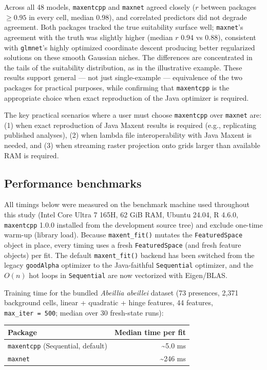 \documentclass[10pt,letterpaper]{article}
\newcounter{none} %
\begin{document}
Across all 48 models, \texttt{maxentcpp} and \texttt{maxnet} agreed
closely (\(r\) between packages \(\ge 0.95\) in every cell, median
0.98), and correlated predictors did not degrade agreement. Both
packages tracked the true suitability surface well; \texttt{maxnet}'s
agreement with the truth was slightly higher (median \(r\) 0.94 vs
0.88), consistent with \texttt{glmnet}'s highly optimized coordinate
descent producing better regularized solutions on these smooth Gaussian
niches. The differences are concentrated in the tails of the suitability
distribution, as in the illustrative example. These results support
general --- not just single-example --- equivalence of the two packages
for practical purposes, while confirming that \texttt{maxentcpp} is the
appropriate choice when exact reproduction of the Java optimizer is
required.

The key practical scenarios where a user must choose \texttt{maxentcpp}
over \texttt{maxnet} are: (1) when exact reproduction of Java Maxent
results is required (e.g., replicating published analyses), (2) when
lambda file interoperability with Java Maxent is needed, and (3) when
streaming raster projection onto grids larger than available RAM is
required.

\subsection*{Performance benchmarks}

All timings below were measured on the benchmark machine used
throughout this study (Intel Core Ultra 7 165H, 62 GiB RAM, Ubuntu
24.04, R 4.6.0, \texttt{maxentcpp} 1.0.0 installed from the development
source tree) and exclude one-time warm-up (library load). Because
\texttt{maxent\_fit()} mutates the \texttt{FeaturedSpace} object in
place, every timing uses a fresh \texttt{FeaturedSpace} (and fresh
feature objects) per fit. The default \texttt{maxent\_fit()} backend
has been switched from the legacy \texttt{goodAlpha} optimizer to the
Java-faithful \texttt{Sequential} optimizer, and the \(O(n)\) hot loops
in \texttt{Sequential} are now vectorized with Eigen/BLAS.

Training time for the bundled \emph{Abeillia abeillei} dataset (73
presences, 2,371 background cells, linear + quadratic + hinge features,
44 features, \texttt{max\_iter\ =\ 500}; median over 30 fresh-state runs):

{\def\LTcaptype{none} %
\begin{longtable}[]{@{}lr@{}}
\toprule\noalign{}
Package & Median time per fit \\
\midrule\noalign{}
\endhead
\bottomrule\noalign{}
\endlastfoot
\texttt{maxentcpp} (Sequential, default) & \textasciitilde5.0 ms \\
\texttt{maxnet} & \textasciitilde246 ms \\
\end{longtable}
}
\end{document}
